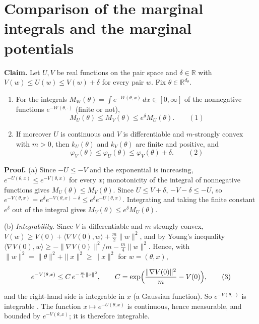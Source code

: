 \documentclass[11pt,a4paper]{article}
\begin{document}
\section{\texorpdfstring{Comparison of the marginal integrals and the marginal potentials}{Comparison of the marginal integrals and the marginal potentials}}


\textbf{Claim.} Let \(U,V\) be real functions on the pair space and \(\delta\in\mathbb R\) with \(V(w)\le U(w)\le V(w)+\delta\) for every pair \(w\). Fix \(\theta\in\mathbb R^{d_\theta}\).



\begin{enumerate}


\item For the integrals \(M_W(\theta)=\int e^{-W(\theta,x)}\,dx\in[0,\infty]\) of the nonnegative functions \(e^{-W(\theta,\cdot)}\) (finite or not),
\[M_U(\theta)\le M_V(\theta)\le e^\delta M_U(\theta).\qquad(1)\]

\item If moreover \(U\) is continuous and \(V\) is differentiable and \(m\)-strongly convex with \(m>0\), then \(k_U(\theta)\) and \(k_V(\theta)\) are finite and positive, and
\[\varphi_V(\theta)\le\varphi_U(\theta)\le\varphi_V(\theta)+\delta.\qquad(2)\]

\end{enumerate}



\textbf{Proof.} (a) Since \(-U\le-V\) and the exponential is increasing, \(e^{-U(\theta,x)}\le e^{-V(\theta,x)}\) for every \(x\); monotonicity of the integral of nonnegative functions gives \(M_U(\theta)\le M_V(\theta)\). Since \(U\le V+\delta\), \(-V-\delta\le-U\), so \(e^{-V(\theta,x)}=e^\delta e^{-V(\theta,x)-\delta}\le e^\delta e^{-U(\theta,x)}\). Integrating and taking the finite constant \(e^\delta\) out of the integral gives \(M_V(\theta)\le e^\delta M_U(\theta)\).




(b) \emph{Integrability.} Since \(V\) is differentiable and \(m\)-strongly convex, \(V(w)\ge V(0)+\langle\nabla V(0),w\rangle+\frac m2\|w\|^2\), and by Young's inequality \(\langle\nabla V(0),w\rangle\ge-\|\nabla V(0)\|^2/m-\frac m4\|w\|^2\). Hence, with \(\|w\|^2=\|\theta\|^2+\|x\|^2\ge\|x\|^2\) for \(w=(\theta,x)\),


\[e^{-V(\theta,x)}\le C\,e^{-\frac m4\|x\|^2},\qquad C=\exp\Bigl(\frac{\|\nabla V(0)\|^2}{m}-V(0)\Bigr),\qquad(3)\]


and the right-hand side is integrable in \(x\) (a Gaussian function). So \(e^{-V(\theta,\cdot)}\) is integrable \cite[Section~3.9.2]{LangevinLean2026IPLA}. The function \(x\mapsto e^{-U(\theta,x)}\) is continuous, hence measurable, and bounded by \(e^{-V(\theta,x)}\); it is therefore integrable.
\end{document}
